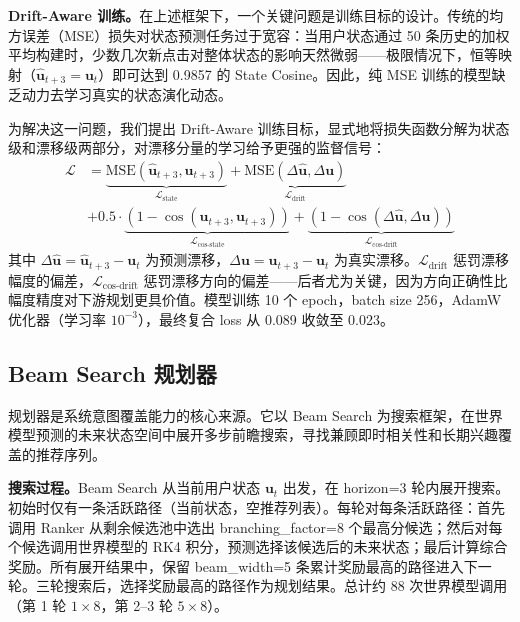 \documentclass[twocolumn,10pt,a4paper]{ctexart}
\begin{document}
\textbf{Drift-Aware 训练。}在上述框架下，一个关键问题是训练目标的设计。传统的均方误差（MSE）损失对状态预测任务过于宽容：当用户状态通过 50 条历史的加权平均构建时，少数几次新点击对整体状态的影响天然微弱——极限情况下，恒等映射（$\hat{\mathbf{u}}_{t+3} = \mathbf{u}_t$）即可达到 0.9857 的 State Cosine。因此，纯 MSE 训练的模型缺乏动力去学习真实的状态演化动态。

为解决这一问题，我们提出 Drift-Aware 训练目标，显式地将损失函数分解为状态级和漂移级两部分，对漂移分量的学习给予更强的监督信号：
\begin{equation}
\begin{aligned}
\mathcal{L} &= \underbrace{\text{MSE}(\hat{\mathbf{u}}_{t+3}, \mathbf{u}_{t+3})}_{\mathcal{L}_{\text{state}}}
+ \underbrace{\text{MSE}(\Delta\hat{\mathbf{u}}, \Delta\mathbf{u})}_{\mathcal{L}_{\text{drift}}} \\
&+ 0.5 \cdot \underbrace{(1 - \cos(\hat{\mathbf{u}}_{t+3}, \mathbf{u}_{t+3}))}_{\mathcal{L}_{\text{cos-state}}}
+ \underbrace{(1 - \cos(\Delta\hat{\mathbf{u}}, \Delta\mathbf{u}))}_{\mathcal{L}_{\text{cos-drift}}}
\end{aligned}
\label{eq:loss}
\end{equation}
其中 $\Delta\hat{\mathbf{u}} = \hat{\mathbf{u}}_{t+3} - \mathbf{u}_t$ 为预测漂移，$\Delta\mathbf{u} = \mathbf{u}_{t+3} - \mathbf{u}_t$ 为真实漂移。$\mathcal{L}_{\text{drift}}$ 惩罚漂移幅度的偏差，$\mathcal{L}_{\text{cos-drift}}$ 惩罚漂移方向的偏差——后者尤为关键，因为方向正确性比幅度精度对下游规划更具价值。模型训练 10 个 epoch，batch size 256，AdamW 优化器（学习率 $10^{-3}$），最终复合 loss 从 0.089 收敛至 0.023。

\subsection{Beam Search 规划器}

规划器是系统意图覆盖能力的核心来源。它以 Beam Search 为搜索框架，在世界模型预测的未来状态空间中展开多步前瞻搜索，寻找兼顾即时相关性和长期兴趣覆盖的推荐序列。

\textbf{搜索过程。}Beam Search 从当前用户状态 $\mathbf{u}_t$ 出发，在 horizon=3 轮内展开搜索。初始时仅有一条活跃路径（当前状态，空推荐列表）。每轮对每条活跃路径：首先调用 Ranker 从剩余候选池中选出 branching\_factor=8 个最高分候选；然后对每个候选调用世界模型的 RK4 积分，预测选择该候选后的未来状态；最后计算综合奖励。所有展开结果中，保留 beam\_width=5 条累计奖励最高的路径进入下一轮。三轮搜索后，选择奖励最高的路径作为规划结果。总计约 88 次世界模型调用（第 1 轮 $1\times 8$，第 2--3 轮 $5\times 8$）。
\end{document}
